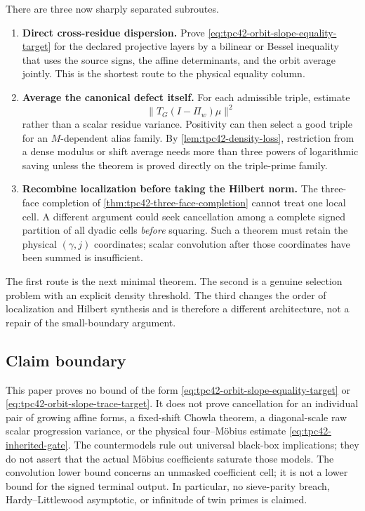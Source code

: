 There are three now sharply separated subroutes.
\begin{enumerate}[label=(\alph*)]
 \item \textbf{Direct cross-residue dispersion.}
 Prove \eqref{eq:tpc42-orbit-slope-equality-target} for the declared
 projective layers by a bilinear or Bessel inequality that uses the
 source signs, the affine determinants, and the orbit average jointly.
 This is the shortest route to the physical equality column.

 \item \textbf{Average the canonical defect itself.}
 For each admissible triple, estimate
 \begin{equation}
  \|T_G(I-\Pi_w)\mu\|^2
  \label{eq:tpc42-next-averaged-defect}
 \end{equation}
 rather than a scalar residue variance.  Positivity can then select a
 good triple for an \(M\)-dependent alias family.  By
 \cref{lem:tpc42-density-loss}, restriction from a dense modulus or
 shift average needs more than three powers of logarithmic saving unless
 the theorem is proved directly on the triple-prime family.

 \item \textbf{Recombine localization before taking the Hilbert norm.}
 The three-face completion of
 \cref{thm:tpc42-three-face-completion} cannot treat one local cell.
 A different argument could seek cancellation among a complete signed
 partition of all dyadic cells \emph{before} squaring.  Such a theorem
 must retain the physical \((\gamma,j)\) coordinates; scalar convolution
 after those coordinates have been summed is insufficient.
\end{enumerate}

The first route is the next minimal theorem.  The second is a genuine
selection problem with an explicit density threshold.  The third changes
the order of localization and Hilbert synthesis and is therefore a
different architecture, not a repair of the small-boundary argument.

\subsection{Claim boundary}

This paper proves no bound of the form
\eqref{eq:tpc42-orbit-slope-equality-target} or
\eqref{eq:tpc42-orbit-slope-trace-target}.  It does not prove
cancellation for an individual pair of growing affine forms, a
fixed-shift Chowla theorem, a diagonal-scale raw scalar progression
variance, or the physical four--M\"obius estimate
\eqref{eq:tpc42-inherited-gate}.  The countermodels rule out universal
black-box implications; they do not assert that the actual M\"obius
coefficients saturate those models.  The convolution lower bound concerns
an unmasked coefficient cell; it is not a lower bound for the signed
terminal output.  In particular, no sieve-parity breach,
Hardy--Littlewood asymptotic, or infinitude of twin primes is claimed.
